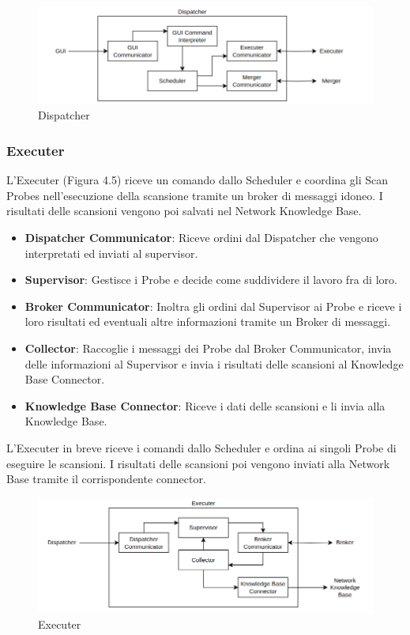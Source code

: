 \documentclass[target=bach,aauheader=,style=]{thud}
\begin{document}
\begin{figure}[t]
  \includegraphics[width=\columnwidth]{dispatcher}
  \centering
  \caption{Dispatcher}
  \label{dispatcher}
\end{figure}

\FloatBarrier

\subsubsection{Executer} 
L'Executer (Figura 4.5) riceve un comando dallo Scheduler e coordina gli Scan Probes nell'esecuzione della scansione tramite un broker di messaggi idoneo. I risultati delle scansioni vengono poi salvati nel Network Knowledge Base.
\begin{itemize}
  \item \textbf{Dispatcher Communicator}: Riceve ordini dal Dispatcher che vengono interpretati ed inviati al supervisor.

  \item \textbf{Supervisor}: Gestisce i Probe e decide come suddividere il lavoro fra di loro. 

  \item \textbf{Broker Communicator}: Inoltra gli ordini dal Supervisor ai Probe e riceve i loro risultati ed eventuali altre informazioni tramite un Broker di messaggi.

  \item \textbf{Collector}: Raccoglie i messaggi dei Probe dal Broker Communicator, invia delle informazioni al Supervisor e invia i risultati delle scansioni al Knowledge Base Connector.

  \item \textbf{Knowledge Base Connector}: Riceve i dati delle scansioni e li invia alla Knowledge Base.
\end{itemize}

L'Executer in breve riceve i comandi dallo Scheduler e ordina ai singoli Probe di eseguire le scansioni. I risultati delle scansioni poi vengono inviati alla Network Base tramite il corrispondente connector.

\begin{figure}[t]
  \includegraphics[width=\columnwidth]{executer}
  \centering
  \caption{Executer}
  \label{executer}
\end{figure}
\end{document}
